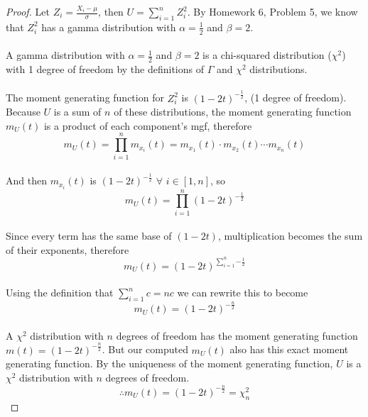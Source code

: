 \documentclass[11pt]{article}
\begin{document}
\begin{enumerate}
\begin{proof}
        Let \(Z_i = \frac{X_i - \mu}{\sigma}\), then \(U = \sum_{i=1}^n Z_i^2\). By Homework 6, Problem 5, we know that \(Z_i^2\) has a gamma distribution with \(\alpha = \frac{1}{2}\) and \(\beta = 2\).
        \\\\A gamma distribution with \(\alpha = \frac{1}{2}\) and \(\beta = 2\) is a chi-squared distribution (\(\chi^2\)) with 1 degree of freedom by the definitions of \(\Gamma\) and \(\chi^2\) distributions.
        \\\\The moment generating function for \(Z_i^2\) is \((1-2 t)^{-\frac{1}{2}}\), (1 degree of freedom). Because \(U\) is a sum of \(n\) of these distributions, the moment generating function \(m_U(t)\) is a product of each component's mgf, therefore
        $$m_U(t) = \prod_{i=1}^{n} m_{x_i}(t) = m_{x_1}(t) \cdot m_{x_2}(t) \cdots m_{x_n}(t)$$
        \\And then \(m_{x_i}(t)\) is \((1-2 t)^{-\frac{1}{2}}\)  \(\forall\) \(i \in [1, n]\), so
        $$m_U(t) = \prod_{i=1}^n (1-2t)^{-\frac{1}{2}}$$
        \\Since every term has the same base of \((1-2t)\), multiplication becomes the sum of their exponents, therefore
        $$m_U(t) = (1-2t)^{\sum_{i=1}^n {-\frac{1}{2} }}$$
        \\Using the definition that \(\sum_{i=1}^n c = n c\) we can rewrite this to become
        $$m_U(t) = (1-2t)^{-\frac{n}{2}}$$
        \\A \(\chi^2\) distribution with \(n\) degrees of freedom has the moment generating function \(m(t) = (1-2t)^{-\frac{n}{2}}\). But our computed \(m_U(t)\) also has this exact moment generating function. By the uniqueness of the moment generating function, \(U\) is a \(\chi^2\) distribution with \(n\) degrees of freedom.
        $$\boxed{\therefore m_U(t) = (1-2t)^{-\frac{n}{2}} = \chi_n^2}$$
    \end{proof}
\end{enumerate}
\end{document}
